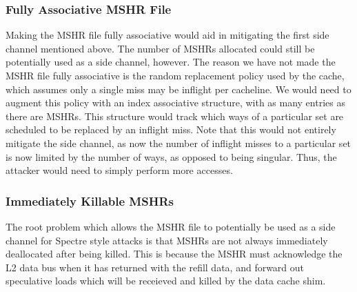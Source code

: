 \subsubsection{Fully Associative MSHR File}
Making the MSHR file fully associative would aid in mitigating the first side channel mentioned above. The number of MSHRs allocated could still be potentially used as a side channel, however. The reason we have not made the MSHR file fully associative is the random replacement policy used by the cache, which assumes only a single miss may be inflight per cacheline. We would need to augment this policy with an index associative structure, with as many entries as there are MSHRs. This structure would track which ways of a particular set are scheduled to be replaced by an inflight miss. Note that this would not entirely mitigate the side channel, as now the number of inflight misses to a particular set is now limited by the number of ways, as opposed to being singular. Thus, the attacker would need to simply perform more accesses.

\subsubsection{Immediately Killable MSHRs}
The root problem which allows the MSHR file to potentially be used as a side channel for Spectre style attacks is that MSHRs are not always immediately deallocated after being killed. This is because the MSHR must acknowledge the L2 data bus when it has returned with the refill data, and forward out speculative loads which will be receieved and killed by the data cache shim.

